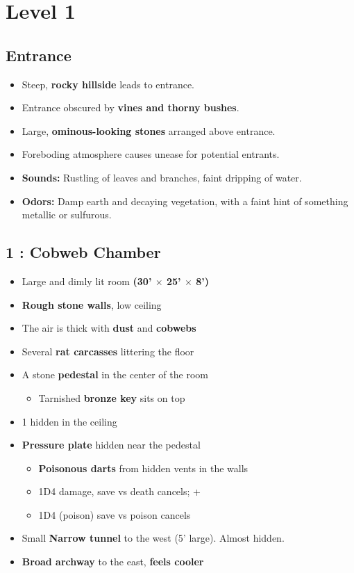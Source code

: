 \section{Level 1}\label{l1}

\subsection{Entrance}\label{l1:out}

\begin{itemize}
  \item Steep, \textbf{rocky hillside} leads to entrance.
  \item Entrance obscured by\textbf{ vines and thorny bushes}.
  \item Large, \textbf{ominous-looking stones} arranged above entrance.
  \item Foreboding atmosphere causes unease for potential entrants.
  \item \textbf{Sounds:} Rustling of leaves and branches, faint dripping of water.
  \item \textbf{Odors:} Damp earth and decaying vegetation, with a faint hint of something metallic or sulfurous.
\end{itemize}


\subsection{1 : Cobweb Chamber}\label{l1:r1}
\begin{itemize}
  \item Large and dimly lit room \textbf{(30' $\times$ 25' $\times$ 8')}
  \item \textbf{Rough stone walls}, low ceiling
  \item The air is thick with \textbf{dust} and \textbf{cobwebs}
  \item Several \textbf{rat carcasses} littering the floor
  \item A stone \textbf{pedestal} in the center of the room
  \begin{itemize}
    \item Tarnished \textbf{bronze key} sits on top
  \end{itemize}
  \item 1 \textbf{} hidden in the ceiling
  \item \textbf{Pressure plate} hidden near the pedestal
  \begin{itemize}
    \item \textbf{Poisonous darts} from hidden vents in the walls
      \item 1D4 damage, save vs death cancels; +
      \item 1D4 (poison) save vs poison cancels
  \end{itemize}
  \item Small \textbf{Narrow tunnel} to the west (5' large).
  Almost hidden.
  \item \textbf{Broad archway} to the east, \textbf{feels cooler}
\end{itemize}

